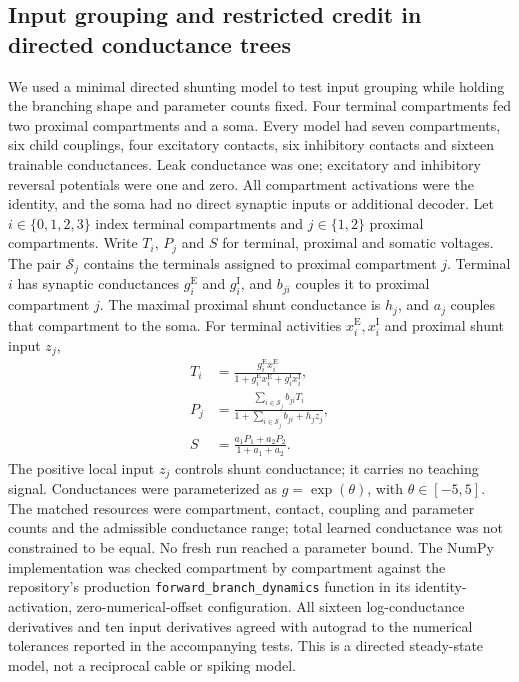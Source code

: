 \subsection{Input grouping and restricted credit in directed conductance trees}
\label{sec:conductance_grouping_bridge}

We used a minimal directed shunting model to test input grouping while holding the branching shape and parameter counts fixed. Four terminal compartments fed two proximal compartments and a soma. Every model had seven compartments, six child couplings, four excitatory contacts, six inhibitory contacts and sixteen trainable conductances. Leak conductance was one; excitatory and inhibitory reversal potentials were one and zero. All compartment activations were the identity, and the soma had no direct synaptic inputs or additional decoder. Let $i\in\{0,1,2,3\}$ index terminal compartments and $j\in\{1,2\}$ proximal compartments. Write $T_i$, $P_j$ and $S$ for terminal, proximal and somatic voltages. The pair $\mathcal S_j$ contains the terminals assigned to proximal compartment $j$. Terminal $i$ has synaptic conductances $g_i^{\mathrm E}$ and $g_i^{\mathrm I}$, and $b_{ji}$ couples it to proximal compartment $j$. The maximal proximal shunt conductance is $h_j$, and $a_j$ couples that compartment to the soma. For terminal activities $x_i^{\mathrm E},x_i^{\mathrm I}$ and proximal shunt input $z_j$,
\begin{align}
T_i&=\frac{g_i^{\mathrm E}x_i^{\mathrm E}}
 {1+g_i^{\mathrm E}x_i^{\mathrm E}+g_i^{\mathrm I}x_i^{\mathrm I}},\\
P_j&=\frac{\sum_{i\in\mathcal S_j}b_{ji}T_i}
 {1+\sum_{i\in\mathcal S_j}b_{ji}+h_jz_j},\\
S&=\frac{a_1P_1+a_2P_2}{1+a_1+a_2}.
\end{align}
The positive local input $z_j$ controls shunt conductance; it carries no teaching signal. Conductances were parameterized as $g=\exp(\theta)$, with $\theta\in[-5,5]$. The matched resources were compartment, contact, coupling and parameter counts and the admissible conductance range; total learned conductance was not constrained to be equal. No fresh run reached a parameter bound. The NumPy implementation was checked compartment by compartment against the repository's production \texttt{forward\_branch\_dynamics} function in its identity-activation, zero-numerical-offset configuration. All sixteen log-conductance derivatives and ten input derivatives agreed with autograd to the numerical tolerances reported in the accompanying tests. This is a directed steady-state model, not a reciprocal cable or spiking model.

